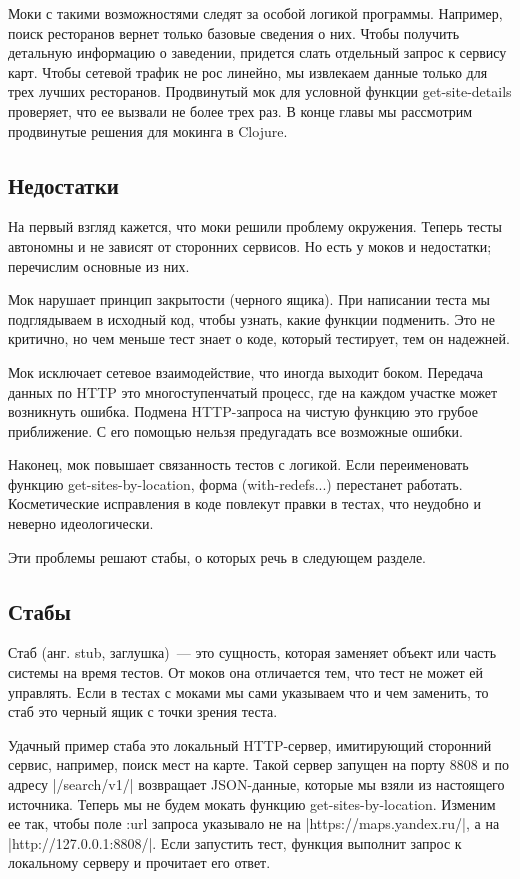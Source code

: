 
Моки с такими возможностями следят за особой логикой программы. Например, поиск
ресторанов вернет только базовые сведения о них. Чтобы получить детальную
информацию о заведении, придется слать отдельный запрос к сервису карт. Чтобы
сетевой трафик не рос линейно, мы извлекаем данные только для трех лучших
ресторанов. Продвинутый мок для условной функции get-site-details проверяет, что
ее вызвали не более трех раз. В конце главы мы рассмотрим продвинутые решения
для мокинга в Clojure.

\subsection{Недостатки}

На первый взгляд кажется, что моки решили проблему окружения. Теперь тесты
автономны и не зависят от сторонних сервисов. Но есть у моков и недостатки;
перечислим основные из них.

Мок нарушает принцип закрытости (черного ящика). При написании теста мы
подглядываем в исходный код, чтобы узнать, какие функции подменить. Это не
критично, но чем меньше тест знает о коде, который тестирует, тем он надежней.

Мок исключает сетевое взаимодействие, что иногда выходит боком. Передача данных
по HTTP это многоступенчатый процесс, где на каждом участке может возникнуть
ошибка. Подмена HTTP-запроса на чистую функцию это грубое приближение. С его
помощью нельзя предугадать все возможные ошибки.

Наконец, мок повышает связанность тестов с логикой. Если переименовать функцию
get-sites-by-location, форма (with-redefs...) перестанет работать. Косметические
исправления в коде повлекут правки в тестах, что неудобно и неверно
идеологически.

Эти проблемы решают стабы, о которых речь в следующем разделе.

\subsection{Стабы}

Стаб (анг. stub, заглушка)~--- это сущность, которая заменяет объект или часть
системы на время тестов. От моков она отличается тем, что тест не может ей
управлять. Если в тестах с моками мы сами указываем что и чем заменить, то стаб
это черный ящик с точки зрения теста.

Удачный пример стаба это локальный HTTP-сервер, имитирующий сторонний сервис,
например, поиск мест на карте. Такой сервер запущен на порту 8808 и по адресу
\spverb|/search/v1/| возвращает JSON-данные, которые мы взяли из настоящего
источника. Теперь мы не будем мокать функцию get-sites-by-location. Изменим ее
так, чтобы поле :url запроса указывало не на \spverb|https://maps.yandex.ru/|, а на
\spverb|http://127.0.0.1:8808/|. Если запустить тест, функция выполнит запрос к
локальному серверу и прочитает его ответ.

